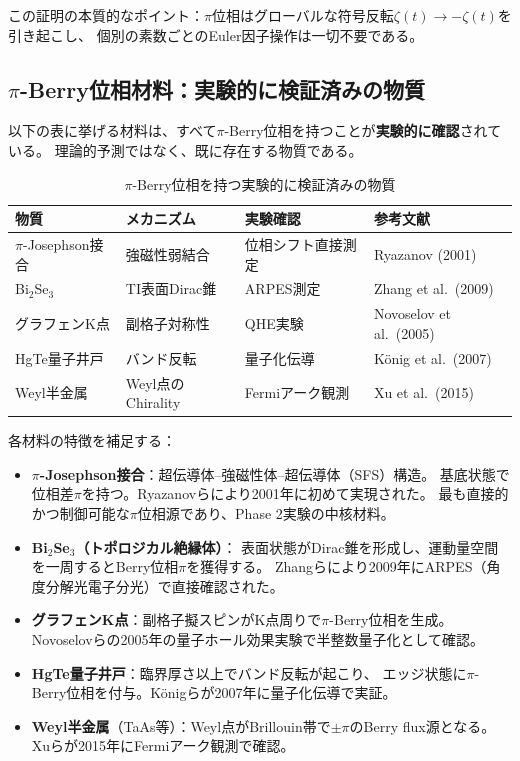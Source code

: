 \begin{remark}
この証明の本質的なポイント：$\pi$位相はグローバルな符号反転$\zeta(t)\to-\zeta(t)$を引き起こし、
個別の素数ごとのEuler因子操作は一切不要である。
\end{remark}


\subsection{$\pi$-Berry位相材料：実験的に検証済みの物質}
\label{sec:12.2}

以下の表に挙げる材料は、すべて$\pi$-Berry位相を持つことが\textbf{実験的に確認}されている。
理論的予測ではなく、既に存在する物質である。

\begin{table}[htbp]
\centering
\caption{$\pi$-Berry位相を持つ実験的に検証済みの物質}
\label{tab:pi-berry-materials}
\begin{tabular}{@{}llll@{}}
\toprule
\textbf{物質} & \textbf{メカニズム} & \textbf{実験確認} & \textbf{参考文献} \\
\midrule
$\pi$-Josephson接合 & 強磁性弱結合 & 位相シフト直接測定 & Ryazanov (2001) \\
Bi$_2$Se$_3$ & TI表面Dirac錐 & ARPES測定 & Zhang et al.\ (2009) \\
グラフェンK点 & 副格子対称性 & QHE実験 & Novoselov et al.\ (2005) \\
HgTe量子井戸 & バンド反転 & 量子化伝導 & K\"onig et al.\ (2007) \\
Weyl半金属 & Weyl点のChirality & Fermiアーク観測 & Xu et al.\ (2015) \\
\bottomrule
\end{tabular}
\end{table}

\noindent
各材料の特徴を補足する：

\begin{itemize}[leftmargin=2em]
\item \textbf{$\pi$-Josephson接合}：超伝導体--強磁性体--超伝導体（SFS）構造。
基底状態で位相差$\pi$を持つ。Ryazanovらにより2001年に初めて実現された。
最も直接的かつ制御可能な$\pi$位相源であり、Phase 2実験の中核材料。

\item \textbf{Bi$_2$Se$_3$（トポロジカル絶縁体）}：
表面状態がDirac錐を形成し、運動量空間を一周するとBerry位相$\pi$を獲得する。
Zhangらにより2009年にARPES（角度分解光電子分光）で直接確認された。

\item \textbf{グラフェンK点}：副格子擬スピンがK点周りで$\pi$-Berry位相を生成。
Novoselovらの2005年の量子ホール効果実験で半整数量子化として確認。

\item \textbf{HgTe量子井戸}：臨界厚さ以上でバンド反転が起こり、
エッジ状態に$\pi$-Berry位相を付与。K\"onigらが2007年に量子化伝導で実証。

\item \textbf{Weyl半金属}（TaAs等）：Weyl点がBrillouin帯で$\pm\pi$のBerry flux源となる。
Xuらが2015年にFermiアーク観測で確認。
\end{itemize}


